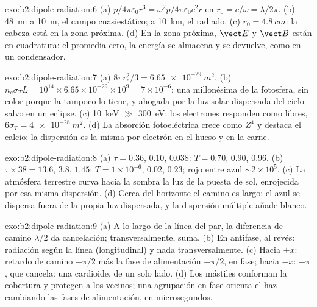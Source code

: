 \begin{solution}{exo:b2:dipole-radiation:6}
(a) $p/4\pi\varepsilon_0r^3 = \omega^2p/4\pi\varepsilon_0c^2r$ en $r_0 = c/\omega = \lambda/2\pi$. (b) \qty{48}{m}:
a \qty{10}{m}, el campo cuasiestático; a \qty{10}{km}, el radiado. (c)
$r_0 = \qty{4.8}{cm}$: la cabeza está en la zona próxima. (d) En la zona próxima, $\vect E$
y $\vect B$ están en cuadratura: el  promedia cero,
la energía se almacena y se devuelve, como en un condensador.
\end{solution}

\begin{solution}{exo:b2:dipole-radiation:7}
(a) $8\pi r_e^2/3 = \qty{6.65e-29}{m^2}$. (b) $n_e\sigma_TL = 10^{14} \times 6.65 \times 10^{-29}
\times 10^9 = 7 \times 10^{-6}$: una millonésima de la fotosfera, sin color porque
la  tampoco lo tiene, y ahogada por la luz solar dispersada del cielo
salvo en un eclipse. (c) \qty{10}{keV} $\gg$ \qty{300}{eV}: los electrones responden como
libres, $6\sigma_T = \qty{4e-28}{m^2}$. (d) La absorción fotoeléctrica crece como $Z^4$
y destaca el calcio; la dispersión es la misma por electrón en el hueso
y en la carne.
\end{solution}

\begin{solution}{exo:b2:dipole-radiation:8}
(a) $\tau = 0.36$, $0.10$, $0.038$: $T = 0.70$, $0.90$, $0.96$. (b) $\tau \times 38 = 13.6$,
$3.8$, $1.45$: $T = 1 \times 10^{-6}$, $0.02$, $0.23$; rojo entre azul $\sim 2 \times 10^5$. (c)
La atmósfera terrestre curva hacia la sombra la luz de la puesta de sol, enrojecida
por esa misma dispersión. (d) Cerca del horizonte el camino es largo: el
azul se dispersa fuera de la propia luz dispersada, y la dispersión
múltiple añade blanco.
\end{solution}

\begin{solution}{exo:b2:dipole-radiation:9}
(a) A lo largo de la línea del par, la diferencia de camino $\lambda/2$ da
cancelación; transversalmente, suma. (b) En antifase, al revés:
radiación según la línea (longitudinal) y nada transversalmente. (c) Hacia $+x$:
retardo de camino $-\pi/2$ más la fase de alimentación $+\pi/2$, en fase; hacia $-x$:
$-\pi$, que cancela: una cardioide, de un solo lado. (d) Los mástiles conforman la cobertura
y protegen a los vecinos; una agrupación en fase orienta el haz cambiando las fases
de alimentación, en microsegundos.
\end{solution}

